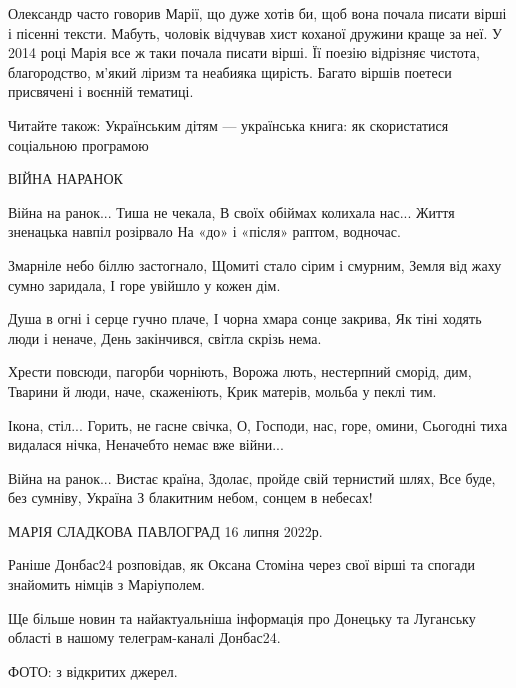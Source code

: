Олександр часто говорив Марії, що дуже хотів би, щоб вона почала писати вірші і
пісенні тексти. Мабуть, чоловік відчував хист коханої дружини краще за неї. У
2014 році Марія все ж таки почала писати вірші. Її поезію відрізняє чистота,
благородство, м'який ліризм та неабияка щирість. Багато віршів поетеси
присвячені і воєнній тематиці.

Читайте також: Українським дітям — українська книга: як скористатися соціальною
програмою

ВІЙНА НАРАНОК

Війна на ранок... Тиша не чекала, В своїх обіймах колихала нас... Життя зненацька
навпіл розірвало На «до» і «після» раптом, водночас.

Змарніле небо біллю застогнало, Щомиті стало сірим і смурним, Земля від жаху
сумно заридала, І горе увійшло у кожен дім.

Душа в огні і серце гучно плаче, І чорна хмара сонце закрива, Як тіні ходять
люди і неначе, День закінчився, світла скрізь нема.

Хрести повсюди, пагорби чорніють, Ворожа лють, нестерпний сморід, дим, Тварини
й люди, наче, скаженіють, Крик матерів, мольба у пеклі тим.

Ікона, стіл... Горить, не гасне свічка, О, Господи, нас, горе, омини, Сьогодні
тиха видалася нічка, Неначебто немає вже війни...

Війна на ранок... Вистає країна, Здолає, пройде свій тернистий шлях, Все буде,
без сумніву, Україна З блакитним небом, сонцем в небесах!

МАРІЯ СЛАДКОВА ПАВЛОГРАД 16 липня 2022р.

Раніше Донбас24 розповідав, як Оксана Стоміна через свої вірші та спогади
знайомить німців з Маріуполем.

Ще більше новин та найактуальніша інформація про Донецьку та Луганську області
в нашому телеграм-каналі Донбас24.

ФОТО: з відкритих джерел.

